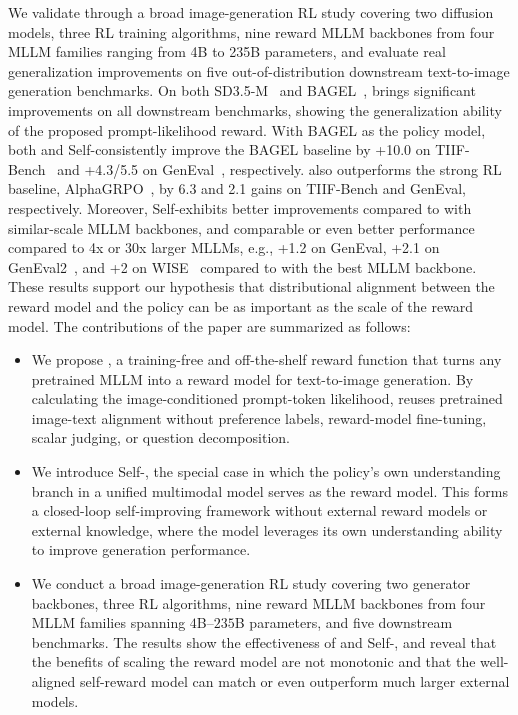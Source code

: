 We validate \method through a broad image-generation RL study covering
two diffusion models, three RL training algorithms, nine reward MLLM backbones from four MLLM
families ranging from 4B to 235B parameters, and evaluate real generalization improvements on five out-of-distribution downstream text-to-image generation benchmarks.
On both SD3.5-M~\cite{sd3} and BAGEL~\cite{bagel}, \method brings significant improvements on all downstream benchmarks, showing the generalization ability of the proposed prompt-likelihood reward.
With BAGEL as the policy model, both \method and Self-\method consistently improve the BAGEL baseline by +10.0 on TIIF-Bench~\cite{tiif} and +4.3/5.5 on GenEval~\cite{geneval}, respectively.
\method also outperforms the strong RL baseline, AlphaGRPO~\cite{alphagrpo}, by 6.3 and 2.1 gains on TIIF-Bench and GenEval, respectively.
Moreover, Self-\method exhibits better improvements compared to \method with similar-scale MLLM backbones, and comparable or even better performance compared to 4x or 30x larger MLLMs,
e.g., +1.2 on GenEval, +2.1 on GenEval2~\cite{kamath2025geneval}, and +2 on WISE~\cite{wise} compared to \method with the best MLLM backbone.
These results support our hypothesis that distributional alignment between the reward model and the policy can be
as important as the scale of the reward model. The contributions of the paper are summarized as follows:
\begin{itemize}[leftmargin=*, itemsep=1pt, topsep=1pt]
  \item We propose \method, a training-free and off-the-shelf reward
  function that turns any pretrained MLLM into a reward model for text-to-image generation. 
  By calculating the image-conditioned prompt-token likelihood, 
  \method reuses pretrained image-text alignment without preference labels, 
  reward-model fine-tuning, scalar judging, or question decomposition.

  \item We introduce {Self-\method}, the special case in which the policy's own understanding branch in a unified multimodal model serves as the reward model. 
  This forms a closed-loop self-improving framework without external reward models or 
  external knowledge, where the model leverages its own understanding ability to improve generation performance.

  \item We conduct a broad image-generation RL study covering two
  generator backbones, three RL algorithms, nine reward MLLM backbones
  from four MLLM families spanning $4$B--$235$B parameters, and five
  downstream benchmarks. The results show the effectiveness of \method and Self-\method, and reveal that the benefits of scaling the reward model are not monotonic
  and that the well-aligned self-reward model can match or even outperform much larger
  external models.
\end{itemize}

